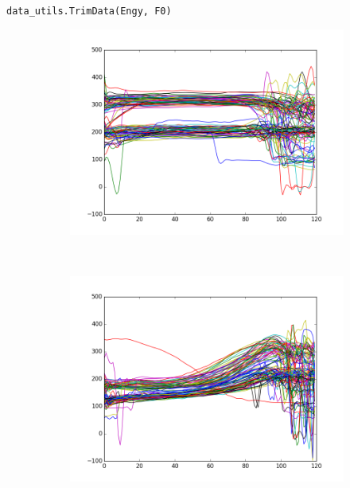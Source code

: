 \documentclass[12pt]{article}
\begin{document}
\begin{itemize}
\begin{description}
				\texttt{data\_utils.TrimData(Engy, F0)}
		\end{description}
\begin{figure}[htb]
	\centering
	\begin{subfigure}[b]{0.49\textwidth}
	    \includegraphics[width=\textwidth]{original-0}
	\end{subfigure}
	~
	\begin{subfigure}[b]{0.49\textwidth}
    	\includegraphics[width=\textwidth]{original-1}
	\end{subfigure}
	\begin{subfigure}[b]{0.49\textwidth}

\end{subfigure}
\end{figure}
\end{itemize}
\end{document}
